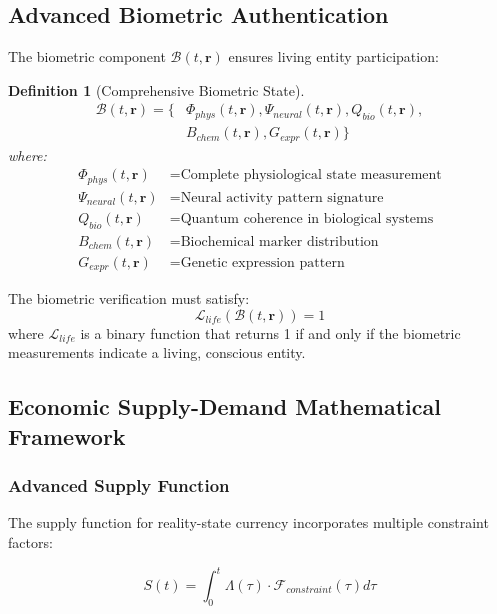 \documentclass[12pt,a4paper]{article}
\newtheorem{definition}[theorem]{Definition}
\begin{document}
\subsection{Advanced Biometric Authentication}

The biometric component $\mathcal{B}(t,\mathbf{r})$ ensures living entity participation:

\begin{definition}[Comprehensive Biometric State]
\begin{align}
\mathcal{B}(t,\mathbf{r}) = \{&\Phi_{phys}(t,\mathbf{r}), \Psi_{neural}(t,\mathbf{r}), Q_{bio}(t,\mathbf{r}), \\
&B_{chem}(t,\mathbf{r}), G_{expr}(t,\mathbf{r})\}
\end{align}
where:
\begin{align}
\Phi_{phys}(t,\mathbf{r}) &= \text{Complete physiological state measurement} \\
\Psi_{neural}(t,\mathbf{r}) &= \text{Neural activity pattern signature} \\
Q_{bio}(t,\mathbf{r}) &= \text{Quantum coherence in biological systems} \\
B_{chem}(t,\mathbf{r}) &= \text{Biochemical marker distribution} \\
G_{expr}(t,\mathbf{r}) &= \text{Genetic expression pattern}
\end{align}
\end{definition}

The biometric verification must satisfy:
\begin{equation}
\mathcal{L}_{life}(\mathcal{B}(t,\mathbf{r})) = 1
\end{equation}
where $\mathcal{L}_{life}$ is a binary function that returns 1 if and only if the biometric measurements indicate a living, conscious entity.

\subsection{Economic Supply-Demand Mathematical Framework}

\subsubsection{Advanced Supply Function}

The supply function for reality-state currency incorporates multiple constraint factors:

\begin{equation}
S(t) = \int_0^t \Lambda(\tau) \cdot \mathcal{F}_{constraint}(\tau) d\tau
\end{equation}
\end{document}
